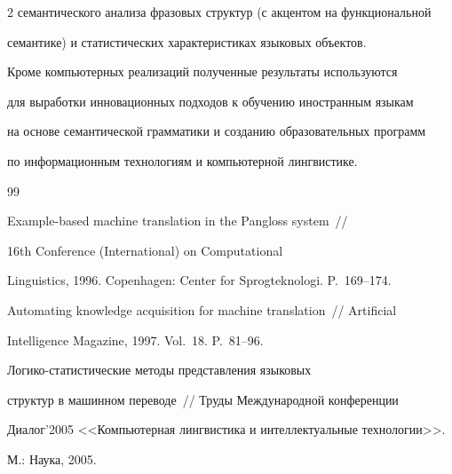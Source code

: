 \begin{multicols}{2}
семантического анализа фразовых структур (с акцентом на функциональной 


семантике) и статистических характеристиках языковых объектов.





Кроме компьютерных реализаций полученные результаты используются


для выработки инновационных подходов к обучению иностранным языкам


на основе семантической грамматики и созданию образовательных программ


по информационным технологиям и компьютерной лингвистике.





{\small\frenchspacing


{%




\begin{thebibliography}{99}






Example-based machine translation in the Pangloss system~//


16th Conference (International) on Computational


Linguistics, 1996. Copenhagen: Center for Sprogteknologi. P.~169--174.









Automating knowledge acquisition for machine translation~// Artificial


Intelligence Magazine, 1997. Vol.~18. P.~81--96.









Логико-статистические методы представления языковых


структур в машинном переводе~// Труды Международной конференции


Диалог'2005 <<Компьютерная лингвистика и интеллектуальные технологии>>.


М.: Наука, 2005.






\end{thebibliography}}}
\end{multicols}
